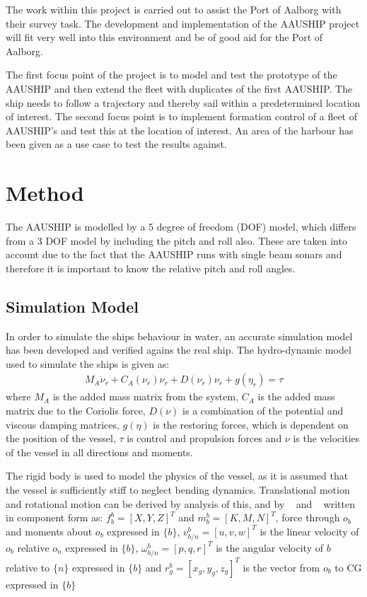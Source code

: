 \documentclass[conference]{IEEEtran}
\begin{document}
The work within this project is carried out to assist the Port of
Aalborg with their survey task. The development and implementation of
the AAUSHIP project will fit very well into this environment and be of
good aid for the Port of Aalborg.

The first focus point of the project is to model and test the
prototype of the AAUSHIP and then extend the fleet with duplicates of
the first AAUSHIP. The ship needs to follow a trajectory and thereby
sail within a predetermined location of interest. The second focus
point is to implement formation control of a fleet of AAUSHIP's and
test this at the location of interest. An area of the harbour has been
given as a use case to test the results against.

\section{Method}
The AAUSHIP is modelled by a 5 degree of freedom (DOF) model, which differs
from a 3 DOF model by including the pitch and roll also.
These are taken into account due to the fact that the AAUSHIP runs
with single beam sonars and therefore it is important to know the
relative pitch and roll angles. 

\subsection{Simulation Model}
\label{ch:simulation-model}
In order to simulate the ships behaviour in water, an accurate
simulation model has been developed and verified agains the real ship.
The hydro-dynamic model used to simulate the ships is given as:
\begin{align}
M_A \dot \nu_r + C_A(\nu_r)\nu_r + D(\nu_r)\nu_r + g(\eta_r) = \tau
\label{eq:hydmodel}
\end{align}
where
$M_A$ is the added mass matrix from the system, $C_A$ is the added mass matrix due to the Coriolis force, $D(\nu)$ is a combination of the potential and viscous damping matrices, $g(\eta)$ is the restoring forces, which is dependent on the position of the vessel, $\tau$ is control and propulsion forces and $\nu$ is the velocities of the vessel in all directions and moments.

The rigid body is used to model the physics of the vessel, as it is
assumed that the vessel is sufficiently stiff to neglect bending
dynamics. Translational motion and rotational motion can be derived by
analysis of this, and by ~\citep{sname1950} and ~\citep[sec.
(3.3.1)]{fossen} written in component form as:
$f^b_b = [X,Y,Z]^T$ and $m^b_b = [K,M,N]^T$, force through $o_b$ and moments about $o_b$ expressed in $\{b\}$,
$v^b_{b/n} = [u,v,w]^T$ is the linear velocity of $o_b$ relative $o_n$ expressed in $\{b\}$,
$\omega^b_{b/n} = [p,q,r]^T$ is the angular velocity of ${b}$ relative to $\{n\}$ expressed in  $\{b\}$ and 
$r^b_g = [x_g,y_g,z_g]^T$ is the vector from $o_b$ to CG expressed in $\{b\}$
\end{document}
